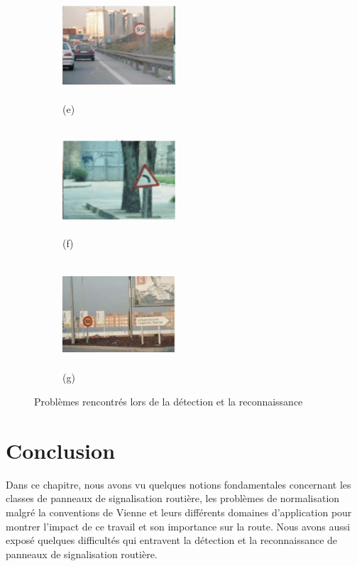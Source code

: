 \begin{figure}[h]
\begin{subfigure}
           \caption{(d)}
        \end{subfigure}
        \begin{subfigure}
            \centering
            \includegraphics[width=4.2cm,height=4cm]{images/e.png} 
            \caption{(e)}
        \end{subfigure}
        \begin{subfigure}
            \centering
            \includegraphics[width=4.2cm,height=4cm]{images/f.png} 
            \caption{(f)}
        \end{subfigure}
        \begin{subfigure}
            \centering
            \includegraphics[width=4.2cm,height=4cm]{images/g.png}
            \caption{(g)}
        \end{subfigure}
        \caption{Problèmes rencontrés lors de la  détection et la reconnaissance }
        \label{fig:problemes}
\end{figure}
  \newpage
\section{Conclusion}
Dans ce chapitre, nous avons vu quelques notions fondamentales concernant les classes de panneaux de signalisation routière, les problèmes de normalisation malgré la conventions de Vienne et leurs différents domaines d’application pour montrer l’impact de ce travail et son importance sur la route. Nous avons aussi exposé quelques difficultés qui entravent la détection et la reconnaissance de panneaux de signalisation routière.
